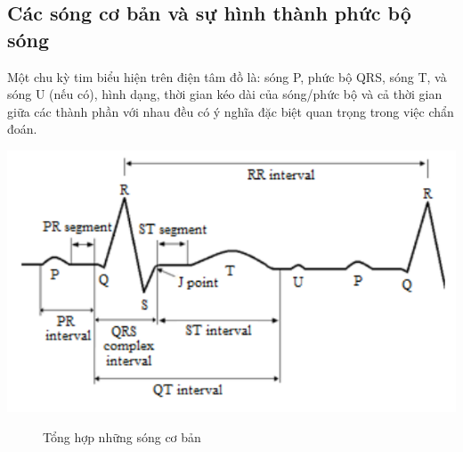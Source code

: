 \subsection{Các sóng cơ bản và sự hình thành phức bộ sóng}
Một chu kỳ tim biểu hiện trên điện tâm đồ là: sóng P, phức bộ QRS, sóng T, và sóng U (nếu có), hình dạng, thời gian kéo dài của sóng/phức bộ và cả thời gian giữa các thành phần với nhau đều có ý nghĩa đặc biệt quan trọng trong việc chẩn đoán.
\begin{center}
        \includegraphics[scale=.4]{image/week1/h32.png}
        \begin{figure}[htp]
        \begin{center}
        \end{center}
        \caption{Tổng hợp những sóng cơ bản}
        \end{figure}
\end{center}

